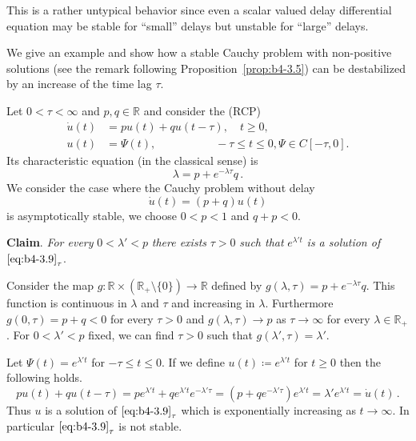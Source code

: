 This is a rather untypical behavior since even a scalar valued delay differential equation may be stable for \enquote{small} delays but unstable for \enquote{large} delays.
	
We give an example and show how a stable Cauchy problem with non-positive solutions (see the remark following Proposition~\ref{prop:b4-3.5}) can be destabilized by an increase of the time lag $\tau$.
	
Let $0 < \tau < \infty$ and $p,q \in \mathbb{R}$ and consider the (RCP)
	\begin{equation}\label{eq:b4-3.9}	\begin{aligned}
		\dot{u}(t) &= pu(t) + qu(t-\tau) , \quad t \geq 0 ,\\
		u(t) &= \Psi(t) , \quad\quad\quad\quad\quad\; -\tau \leq t \leq 0 , \Psi \in C[-\tau,0] .
	\end{aligned}
	\end{equation}
%
%
Its characteristic equation (in the classical sense) is 
\begin{equation}\label{eq:b4-3.10}
\lambda = p + e^{-\lambda\tau}q\,.
\end{equation}
We consider the case where the Cauchy problem without delay
\[
\dot{u}(t) = (p + q)u(t)
\]
is asymptotically stable, \ie we choose $0 < p < 1$ and $q + p < 0$.

\medskip\noindent
\textbf{Claim}.
	\textit{For every} $0 < \lambda' < p$ \textit{there exists} $\tau > 0$ \textit{such that} $e^{\lambda't}$ \textit{is a solution of} $\eqref{eq:b4-3.9}_{\tau}$.

\medskip 
Consider the map $g \colon \mathbb{R}\times(\mathbb{R}_{+}\setminus\{0\}) \to \mathbb{R}$ defined by $g(\lambda,\tau) = p + e^{-\lambda\tau}q$.
This function is continuous in $\lambda$ and $\tau$ and increasing in $\lambda$.
Furthermore $g(0,\tau) = p + q < 0$ for every $\tau > 0$ and $g(\lambda,\tau) \to p$ as $\tau \to \infty$ for every $\lambda \in \mathbb{R}_{+}$.
For $0 < \lambda' < p$ fixed, we can find $\tau > 0$ such that $g(\lambda',\tau) = \lambda'$.

Let $\Psi(t) = e^{\lambda't}$ for $-\tau \leq t \leq 0$. 
If we define $u(t) \coloneq e^{\lambda't}$ for $t \geq 0$ then the following holds.
\[
pu(t) + qu(t-\tau) = pe^{\lambda't} + qe^{\lambda't}e^{-\lambda'\tau} = (p+qe^{-\lambda'\tau})e^{\lambda't} = \lambda'e^{\lambda't} = \dot{u}(t)\,.
\]
Thus $u$ is a solution of $\eqref{eq:b4-3.9}_{\tau}$ which is exponentially increasing as $t \to \infty$. 
In particular $\eqref{eq:b4-3.9}_{\tau}$ is not stable.

